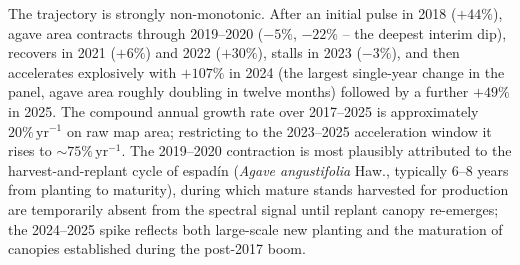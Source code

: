 \documentclass[10pt,a4paper]{article}
\begin{document}
The trajectory is strongly non-monotonic. After an initial pulse
in 2018 ($+44\%$), agave area contracts through 2019--2020
($-5\%$, $-22\%$ -- the deepest interim dip), recovers in 2021
($+6\%$) and 2022 ($+30\%$), stalls in 2023 ($-3\%$), and then
accelerates explosively with \textbf{$+107\%$} in 2024 (the
largest single-year change in the panel, agave area roughly
doubling in twelve months) followed by a further $+49\%$ in 2025.
The compound annual growth rate over 2017--2025 is approximately
$20\%\,\mathrm{yr}^{-1}$ on raw map area; restricting to the
2023--2025 acceleration window it rises to
$\sim 75\%\,\mathrm{yr}^{-1}$. The 2019--2020 contraction is most
plausibly attributed to the harvest-and-replant cycle of espad\'in
(\textit{Agave angustifolia} Haw., typically 6--8 years from
planting to maturity), during which mature stands harvested for
production are temporarily absent from the spectral signal until
replant canopy re-emerges; the 2024--2025 spike reflects both
large-scale new planting and the maturation of canopies established
during the post-2017 boom.
\end{document}
